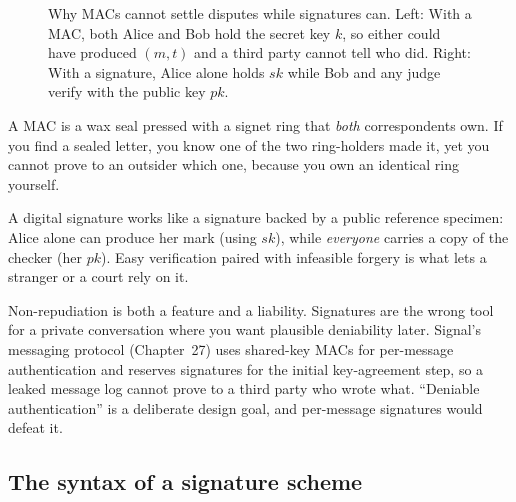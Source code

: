 \begin{figure}[htbp]
\caption{Why MACs cannot settle disputes while signatures can. Left: With a MAC, both Alice and Bob hold the secret key $k$, so either could have produced $(m, t)$ and a third party cannot tell who did. Right: With a signature, Alice alone holds $sk$ while Bob and any judge verify with the public key $pk$.}
\label{fig:ch22-mac-vs-sig}
\end{figure}

\begin{intuitionbox}
A MAC is a wax seal pressed with a signet ring that \emph{both} correspondents own. If you find a sealed letter, you know one of the two ring-holders made it, yet you cannot prove to an outsider which one, because you own an identical ring yourself.

A digital signature works like a signature backed by a public reference specimen: Alice alone can produce her mark (using $sk$), while \emph{everyone} carries a copy of the checker (her $pk$). Easy verification paired with infeasible forgery is what lets a stranger or a court rely on it.
\end{intuitionbox}

\begin{focusbox}
Non-repudiation is both a feature and a liability. Signatures are the wrong tool for a private conversation where you want plausible deniability later. Signal's messaging protocol (Chapter~27) uses shared-key MACs for per-message authentication and reserves signatures for the initial key-agreement step, so a leaked message log cannot prove to a third party who wrote what. ``Deniable authentication'' is a deliberate design goal, and per-message signatures would defeat it.
\end{focusbox}

\subsection{The syntax of a signature scheme}
\label{ch22:syntax}

